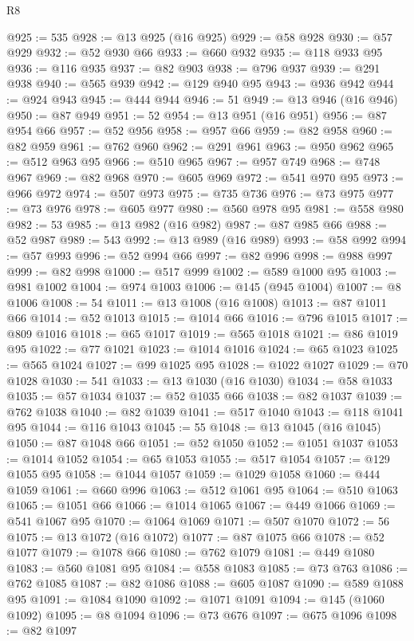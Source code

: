 \begin{lexlean}{R8}
\begin{coremodule}
@925 := 535
@928 := @13 @925 (@16 @925)
@929 := @58 @928
@930 := @57 @929
@932 := @52 @930 @66
@933 := @660 @932
@935 := @118 @933 @95
@936 := @116 @935
@937 := @82 @903
@938 := @796 @937
@939 := @291 @938
@940 := @565 @939
@942 := @129 @940 @95
@943 := @936 @942
@944 := @924 @943
@945 := @444 @944
@946 := 51
@949 := @13 @946 (@16 @946)
@950 := @87 @949
@951 := 52
@954 := @13 @951 (@16 @951)
@956 := @87 @954 @66
@957 := @52 @956
@958 := @957 @66
@959 := @82 @958
@960 := @82 @959
@961 := @762 @960
@962 := @291 @961
@963 := @950 @962
@965 := @512 @963 @95
@966 := @510 @965
@967 := @957 @749
@968 := @748 @967
@969 := @82 @968
@970 := @605 @969
@972 := @541 @970 @95
@973 := @966 @972
@974 := @507 @973
@975 := @735 @736
@976 := @73 @975
@977 := @73 @976
@978 := @605 @977
@980 := @560 @978 @95
@981 := @558 @980
@982 := 53
@985 := @13 @982 (@16 @982)
@987 := @87 @985 @66
@988 := @52 @987
@989 := 543
@992 := @13 @989 (@16 @989)
@993 := @58 @992
@994 := @57 @993
@996 := @52 @994 @66
@997 := @82 @996
@998 := @988 @997
@999 := @82 @998
@1000 := @517 @999
@1002 := @589 @1000 @95
@1003 := @981 @1002
@1004 := @974 @1003
@1006 := @145 (@945 @1004)
@1007 := @8 @1006
@1008 := 54
@1011 := @13 @1008 (@16 @1008)
@1013 := @87 @1011 @66
@1014 := @52 @1013
@1015 := @1014 @66
@1016 := @796 @1015
@1017 := @809 @1016
@1018 := @65 @1017
@1019 := @565 @1018
@1021 := @86 @1019 @95
@1022 := @77 @1021
@1023 := @1014 @1016
@1024 := @65 @1023
@1025 := @565 @1024
@1027 := @99 @1025 @95
@1028 := @1022 @1027
@1029 := @70 @1028
@1030 := 541
@1033 := @13 @1030 (@16 @1030)
@1034 := @58 @1033
@1035 := @57 @1034
@1037 := @52 @1035 @66
@1038 := @82 @1037
@1039 := @762 @1038
@1040 := @82 @1039
@1041 := @517 @1040
@1043 := @118 @1041 @95
@1044 := @116 @1043
@1045 := 55
@1048 := @13 @1045 (@16 @1045)
@1050 := @87 @1048 @66
@1051 := @52 @1050
@1052 := @1051 @1037
@1053 := @1014 @1052
@1054 := @65 @1053
@1055 := @517 @1054
@1057 := @129 @1055 @95
@1058 := @1044 @1057
@1059 := @1029 @1058
@1060 := @444 @1059
@1061 := @660 @996
@1063 := @512 @1061 @95
@1064 := @510 @1063
@1065 := @1051 @66
@1066 := @1014 @1065
@1067 := @449 @1066
@1069 := @541 @1067 @95
@1070 := @1064 @1069
@1071 := @507 @1070
@1072 := 56
@1075 := @13 @1072 (@16 @1072)
@1077 := @87 @1075 @66
@1078 := @52 @1077
@1079 := @1078 @66
@1080 := @762 @1079
@1081 := @449 @1080
@1083 := @560 @1081 @95
@1084 := @558 @1083
@1085 := @73 @763
@1086 := @762 @1085
@1087 := @82 @1086
@1088 := @605 @1087
@1090 := @589 @1088 @95
@1091 := @1084 @1090
@1092 := @1071 @1091
@1094 := @145 (@1060 @1092)
@1095 := @8 @1094
@1096 := @73 @676
@1097 := @675 @1096
@1098 := @82 @1097

\end{coremodule}
\end{lexlean}
